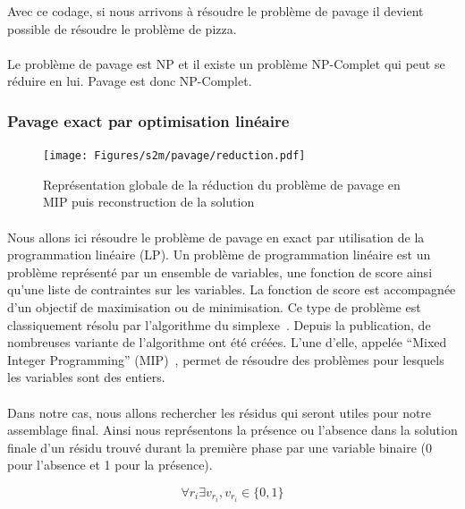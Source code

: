 \documentclass[12pt,french,twoside]{report}
\begin{document}
Avec ce codage, si nous arrivons à résoudre le problème de pavage il devient possible de résoudre le problème de pizza.

\paragraph{}Le problème de pavage est NP et il existe un problème NP-Complet qui peut se réduire en lui.
Pavage est donc NP-Complet.




\subsubsection{Pavage exact par optimisation linéaire}

\label{MIP_p}

\begin{figure}
  \texttt{[image: Figures/s2m/pavage/reduction.pdf]}
  \caption{\label{reduction}Représentation globale de la réduction du problème de pavage en MIP puis reconstruction de la
  solution}
\end{figure}

\paragraph{}Nous allons ici résoudre le problème de pavage en exact par utilisation de la programmation linéaire (LP). Un
problème de programmation linéaire est un
problème représenté par un ensemble de variables, une fonction de score ainsi qu'une liste de contraintes sur les variables. La
fonction de score est accompagnée d'un objectif de maximisation ou de minimisation. Ce type de problème est classiquement résolu
par l'algorithme du simplexe~\cite{murty_linear_1983}. Depuis la publication, de nombreuses variante de l'algorithme ont été
créées. L'une d'elle, appelée ``Mixed Integer Programming'' (MIP)~\cite{wolsey_mixed_2007}, permet de résoudre des problèmes
pour lesquels les variables sont des entiers.

\paragraph{}Dans notre cas, nous allons rechercher les résidus qui seront utiles pour notre assemblage final.
Ainsi nous représentons la présence ou l'absence dans la solution finale d'un résidu trouvé durant la première phase par une
variable binaire (0 pour l'absence et 1 pour la présence).

\begin{equation}
 \forall r_i \exists v_{r_i}, v_{r_i} \in \{0, 1\}
\end{equation}
\end{document}
